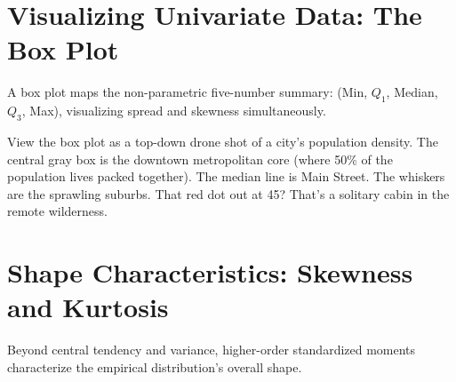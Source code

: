 \documentclass[11pt, a4paper]{article}
\begin{document}
\section{Visualizing Univariate Data: The Box Plot}
A box plot maps the non-parametric five-number summary: (Min, $Q_1$, Median, $Q_3$, Max), visualizing spread and skewness simultaneously.

\vspace{0.5cm}
\begin{center}
\end{center}
\vspace{0.2cm}

\begin{tcolorbox}[profbox, title=Imagine: The City Map]
View the box plot as a top-down drone shot of a city's population density. The central gray box is the downtown metropolitan core (where 50\% of the population lives packed together). The median line is Main Street. The whiskers are the sprawling suburbs. That red dot out at 45? That's a solitary cabin in the remote wilderness.
\end{tcolorbox}

\section{Shape Characteristics: Skewness and Kurtosis}
Beyond central tendency and variance, higher-order standardized moments characterize the empirical distribution's overall shape.
\end{document}
